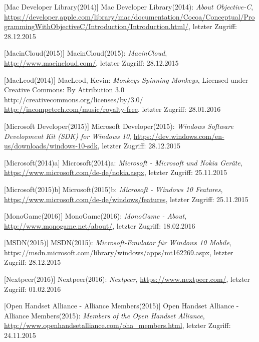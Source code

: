 \begin{thebibliography}{}
[Mac Developer Library(2014)] Mac Developer Library(2014): \emph{About Objective-C},
\url{https://developer.apple.com/library/mac/documentation/Cocoa/Conceptual/ProgrammingWithObjectiveC/Introduction/Introduction.html/}, letzter Zugriff: 28.12.2015

[MacinCloud(2015)] MacinCloud(2015): \emph{MacinCloud},
\url{http://www.macincloud.com/}, letzter Zugriff: 28.12.2015

[MacLeod(2014)] MacLeod, Kevin:
\emph{Monkeys Spinning Monkeys},
Licensed under Creative Commons: By Attribution 3.0
http://creativecommons.org/licenses/by/3.0/
\url{http://incompetech.com/music/royalty-free}, letzter Zugriff: 28.01.2016

[Microsoft Developer(2015)] Microsoft Developer(2015): \emph{Windows Software Development Kit (SDK) for Windows 10},
\url{https://dev.windows.com/en-us/downloads/windows-10-sdk}, letzter Zugriff: 28.12.2015

[Microsoft(2014)a] Microsoft(2014)a: \emph{Microsoft - Microsoft und Nokia Geräte},
\url{https://www.microsoft.com/de-de/nokia.aspx}, letzter Zugriff: 25.11.2015

[Microsoft(2015)b] Microsoft(2015)b: \emph{Microsoft - Windows 10 Features},
\url{https://www.microsoft.com/de-de/windows/features}, letzter Zugriff: 25.11.2015

[MonoGame(2016)] MonoGame(2016): \emph{MonoGame - About},
\url{http://www.monogame.net/about/}, letzter Zugriff: 18.02.2016

[MSDN(2015)] MSDN(2015): \emph{Microsoft-Emulator für Windows 10 Mobile},
\url{https://msdn.microsoft.com/library/windows/apps/mt162269.aspx}, letzter Zugriff: 28.12.2015

[Nextpeer(2016)] Nextpeer(2016): \emph{Nextpeer},
\url{https://www.nextpeer.com/}, letzter Zugriff: 01.02.2016

[Open Handset Alliance - Alliance Members(2015)] Open Handset Alliance - Alliance Members(2015): \emph{Members of the Open Handset Alliance},
\url{http://www.openhandsetalliance.com/oha_members.html}, letzter Zugriff: 24.11.2015


\end{thebibliography}
